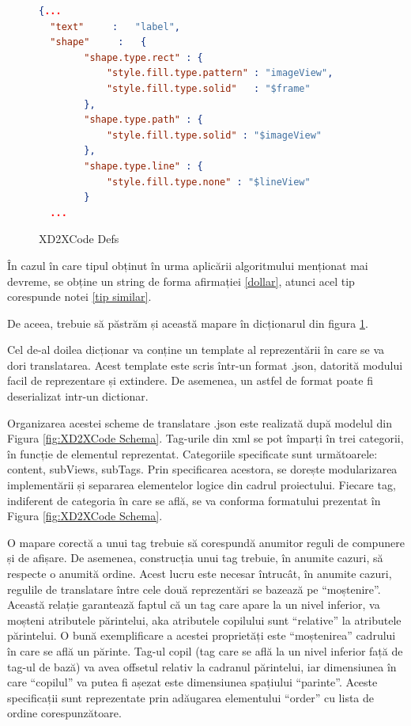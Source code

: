 \begin{figure}[!htbp]
\begin{lstlisting}[language=json,firstnumber=1]
  {...
  "text"     :   "label",
  "shape"     :   {
        "shape.type.rect" : {
            "style.fill.type.pattern" : "imageView",
            "style.fill.type.solid"   : "$frame"
        },
        "shape.type.path" : {
            "style.fill.type.solid" : "$imageView"
        },
        "shape.type.line" : {
            "style.fill.type.none" : "$lineView"
        }
  ...
\end{lstlisting}
\caption{XD2XCode Defs} \label{fig:XD2XCode Defs}
\end{figure}

În cazul în care tipul obținut în urma aplicării algoritmului menționat mai devreme, se obține un string de forma afirmației \ref{dollar}, atunci acel tip corespunde notei \ref{tip similar}.

De aceea, trebuie să păstrăm și această mapare în dicționarul din figura \ref{fig:XD2XCode Defs}.

Cel de-al doilea dicționar va conține un template al reprezentării în care se va dori translatarea. Acest template este scris într-un format .json, datorită modului facil de reprezentare și extindere. De asemenea, un astfel de format poate fi deserializat intr-un dictionar. 

Organizarea acestei scheme de translatare .json este realizată după modelul din Figura \ref{fig:XD2XCode Schema}. Tag-urile din xml se pot împarți în trei categorii, în funcție de elementul reprezentat. Categoriile specificate sunt următoarele: content, subViews, subTags. Prin specificarea acestora, se dorește modularizarea implementării și separarea elementelor logice din cadrul proiectului. Fiecare tag, indiferent de categoria în care se află, se va conforma formatului prezentat în Figura \ref{fig:XD2XCode Schema}.

O mapare corectă a unui tag trebuie să corespundă anumitor reguli de compunere și de afișare. De asemenea, construcția unui tag trebuie, în anumite cazuri, să respecte o anumită ordine. Acest lucru este necesar întrucât, în anumite cazuri, regulile de translatare între cele două reprezentări se bazează pe “moștenire”. Această relație garantează faptul că un tag care apare la un nivel inferior, va moșteni atributele părintelui, aka atributele copilului sunt “relative” la atributele părintelui. O bună exemplificare a acestei proprietăți este “moștenirea” cadrului în care se află un părinte. Tag-ul copil (tag care se află la un nivel inferior față de tag-ul de bază) va avea offsetul relativ la cadranul părintelui, iar dimensiunea în care “copilul” va putea fi așezat este dimensiunea spațiului “parinte”. Aceste specificații sunt reprezentate prin adăugarea elementului “order” cu lista de ordine corespunzătoare. 

